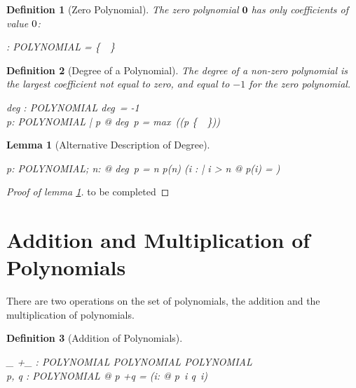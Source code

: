 \documentclass[12pt]{scrartcl}
\newtheorem{lemma}{Lemma}[section]
\newtheorem{zdef}{Definition}[section]
\begin{document}
\newcommand{\zeropol}{\mathbf{0}}
\begin{zdef}[Zero Polynomial]
  \label{zdef:zero-polynomial}
  The \emph{zero polynomial} $\zeropol$ has only coefficients of value
  $0$:
  \begin{axdef}
    \zeropol : POLYNOMIAL
    \where
    \ran \zeropol = \{~\azero~\}
  \end{axdef}
\end{zdef}

\begin{zdef}[Degree of a Polynomial]
  The degree of a non-zero polynomial is the largest coefficient not equal to
  zero, and equal to $-1$ for the zero polynomial.
  \label{zdef:degree}
  \begin{axdef}
    deg : POLYNOMIAL \fun \nat
    \where
    deg~\zeropol = -1 \\
    \forall p: POLYNOMIAL | p \neq \zeropol @ deg~p = max~(\dom (p \nrres
  \{~\azero~\}))\\
  \end{axdef}
\end{zdef}

\begin{lemma}[Alternative Description of Degree]
  \label{lemma:alternative-degree}
  \begin{zed}
    \forall p: POLYNOMIAL; n: \nat @ deg~p = n \iff p(n) \neq \azero \land
    (\forall i : \nat | i > n @ p(i) = \azero)
  \end{zed}
\end{lemma}

\begin{proof}[Proof of lemma \ref{lemma:alternative-degree}]
  to  be completed
  
\end{proof}
\section{Addition and Multiplication of Polynomials}
\label{sec:addition-multiplication}
There are two operations on the set of polynomials, the addition and
the multiplication of polynomials.
\newcommand{\polyplus}{+}
\begin{zdef}[Addition of Polynomials]
  \label{zdef:polynomial-addition}
  \begin{axdef}
    \_ \polyplus \_ : POLYNOMIAL \cross POLYNOMIAL \fun POLYNOMIAL\\
    \where
    \forall p, q : POLYNOMIAL @ p \polyplus q = (\lambda i: \nat @ p~i
    \aplus q~i)
  \end{axdef}
\end{zdef}
\end{document}
